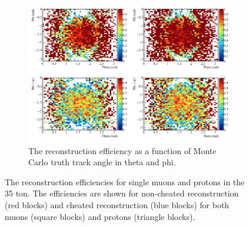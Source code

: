 \begin{figure}[h!]
\begin{subfigure}{0.8\textwidth}
        \includegraphics[width=\textwidth]{Effic_SingSamps_PhiTheta}
        \caption{The reconstruction efficiency as a function of Monte Carlo truth track angle in theta and phi.}
        \label{fig:Isol_Effic_PhiTheta}
  \end{subfigure}%
  \caption[The reconstruction efficiencies for single muons and protons in the 35 ton.]
          {The reconstruction efficiencies for single muons and protons in the 35 ton. The efficiencies are shown for non-cheated reconstruction (red blocks) and cheated reconstruction (blue blocks) for both muons (square blocks) and protons (triangle blocks).}
  \label{fig:Isol_Effic}
\end{figure}

